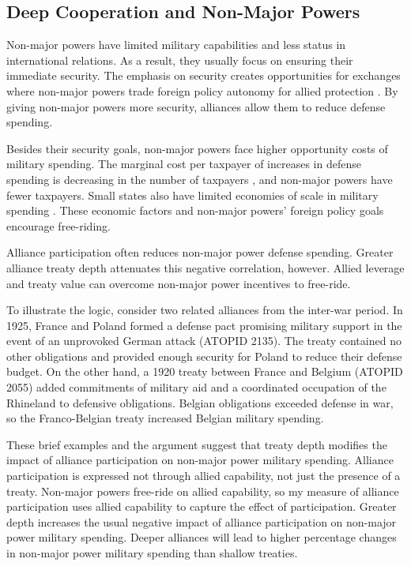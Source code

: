 \documentclass[12pt]{article}
\begin{document}
\subsection{Deep Cooperation and Non-Major Powers} 


Non-major powers have limited military capabilities and less status in international relations. 
As a result, they usually focus on ensuring their immediate security.  
The emphasis on security creates opportunities for exchanges where non-major powers trade foreign policy autonomy for allied protection \citep{Altfield1984, Morrow1991}. 
By giving non-major powers more security, alliances allow them to reduce defense spending. 


Besides their security goals, non-major powers face higher opportunity costs of military spending. 
The marginal cost per taxpayer of increases in defense spending is decreasing in the number of taxpayers \citep{DudleyMontmarquette1981}, and non-major powers have fewer taxpayers. 
Small states also have limited economies of scale in military spending \citep{Moravcsik1991, Kapstein1991, Anderton1995, Devore2013}.
These economic factors and non-major powers' foreign policy goals encourage free-riding.  


Alliance participation often reduces non-major power defense spending. 
Greater alliance treaty depth attenuates this negative correlation, however. 
Allied leverage and treaty value can overcome non-major power incentives to free-ride. 


To illustrate the logic, consider two related alliances from the inter-war period. 
In 1925, France and Poland formed a defense pact promising military support in the event of an unprovoked German attack (ATOPID 2135). 
The treaty contained no other obligations and provided enough security for Poland to reduce their defense budget.
On the other hand, a 1920 treaty between France and Belgium (ATOPID 2055) added commitments of military aid and a coordinated occupation of the Rhineland to defensive obligations. 
Belgian obligations exceeded defense in war, so the Franco-Belgian treaty increased Belgian military spending. 
 
 
These brief examples and the argument suggest that treaty depth modifies the impact of alliance participation on non-major power military spending. 
Alliance participation is expressed not through allied capability, not just the presence of a treaty. 
Non-major powers free-ride on allied capability, so my measure of alliance participation uses allied capability to capture the effect of participation. 
Greater depth increases the usual negative impact of alliance participation on non-major power military spending. 
Deeper alliances will lead to higher percentage changes in non-major power military spending than shallow treaties. 
 
\end{document}
